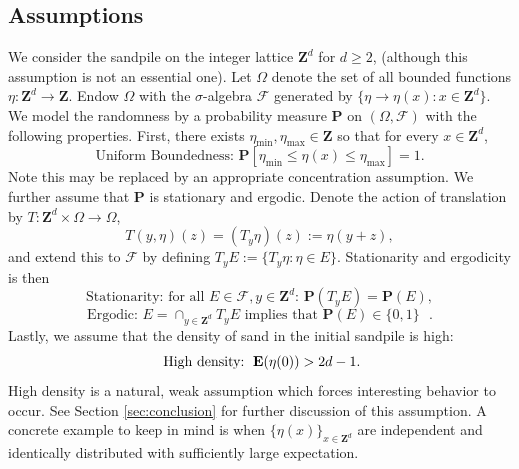 \documentclass[12pt]{amsart}
\newcommand{\Z}{\mathbf{Z}}
\newcommand{\E}{\mathop{\bf E{}}}
\begin{document}
\subsection{Assumptions}  \label{subsec:assumptions}
We consider the sandpile on the integer lattice $\Z^d$ for $d \geq 2$, (although this assumption is not an essential one). 
Let $\Omega$ denote the set of all bounded functions $\eta: \Z^d \to \Z$.  Endow $\Omega$ with the $\sigma$-algebra $\mathcal{F}$ generated by $\{ \eta \to \eta(x) : x \in \Z^d\}$. We model the randomness by a probability measure $\mathbf{P}$ on $(\Omega, \mathcal{F})$ with the following properties. First,  there exists $\eta_{\min}, \eta_{\max} \in \Z$ so that for every $x \in \Z^d$, 
\begin{equation}
\mbox{Uniform Boundedness: }  \mathbf{P}\left[ \eta_{\min} \leq \eta(x) \leq \eta_{\max} \right] = 1. 
\end{equation} 
Note this may be replaced by an appropriate concentration assumption. We further assume that $\mathbf{P}$ is \mbox{stationary} and \mbox{ergodic}. Denote the action of translation by $T: \Z^d \times \Omega \to \Omega$, 
\[
T(y, \eta)(z) = (T_y \eta)(z) := \eta(y + z),
\]
and extend this to $\mathcal{F}$ by defining  $T_y E := \{ T_y \eta : \eta \in E\}$. Stationarity and ergodicity is then
\begin{equation}
\mbox{Stationarity: for all $E \in \mathcal{F}, y \in \Z^d$: } \mathbf{P}(T_y E) = \mathbf{P}(E),
\end{equation}
\begin{equation}
\mbox{Ergodic:  $E = \cap_{y \in \Z^d} T_y E$ implies that $\mathbf{P}(E) \in \{0,1\}$ } . 
\end{equation}
Lastly, we assume that the density of sand in the initial sandpile is high:
\begin{equation}
\mbox{ High density: }  \E(\eta(0)) > 2 d - 1. 
\end{equation}
High density is a natural, weak assumption which forces interesting behavior to occur. See Section \ref{sec:conclusion} for further discussion of this assumption. A concrete example to keep in mind 
is when $\{\eta(x)\}_{x \in \Z^d}$ are independent and identically distributed with sufficiently large expectation. 
\end{document}
